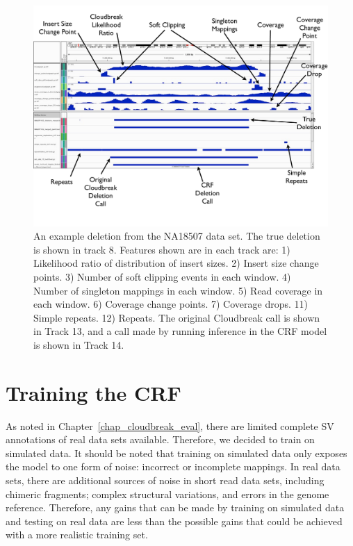 \begin{figure}
\centering
\includegraphics[width=1\textwidth]{figures/true_example_with_features.pdf}
\caption{An example deletion from the NA18507 data set. The true deletion is shown in track 8. Features shown are in each track are: 1) Likelihood ratio of distribution of insert sizes. 2) Insert size change points. 3) Number of soft clipping events in each window. 4) Number of singleton mappings in each window. 5) Read coverage in each window. 6) Coverage change points. 7) Coverage drops. 11) Simple repeats. 12) Repeats. The original Cloudbreak call is shown in Track 13, and a call made by running inference in the CRF model is shown in Track 14.}
\label{crf_features_example}
\end{figure}

\section{Training the CRF}

As noted in Chapter~\ref{chap_cloudbreak_eval}, there are limited complete SV annotations of real data sets available. Therefore, we decided to train on simulated data. It should be noted that training on simulated data only exposes the model to one form of noise: incorrect or incomplete mappings. In real data sets, there are additional sources of noise in short read data sets, including chimeric fragments; complex structural variations, and errors in the genome reference. Therefore, any gains that can be made by training on simulated data and testing on real data are less than the possible gains that could be achieved with a more realistic training set.

